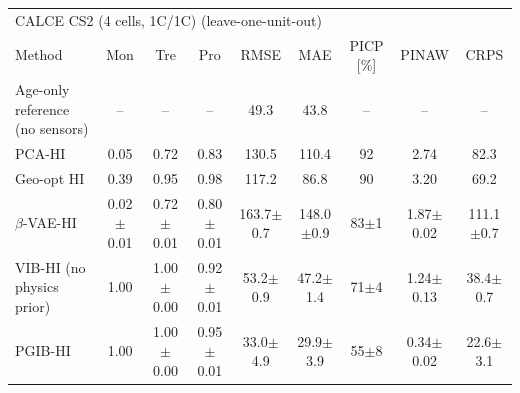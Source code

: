 \begin{tabular}{l c c c c c c c c}
\hline
\multicolumn{9}{l}{CALCE CS2 (4 cells, 1C/1C) (leave-one-unit-out)}\\
 Method & Mon & Tre & Pro & RMSE & MAE & PICP [\%] & PINAW & CRPS \\
\hline
Age-only reference (no sensors) & -- & -- & -- & 49.3 & 43.8 & -- & -- & -- \\
PCA-HI & 0.05 & 0.72 & 0.83 & 130.5 & 110.4 & 92 & 2.74 & 82.3 \\
Geo-opt HI & 0.39 & 0.95 & 0.98 & 117.2 & 86.8 & 90 & 3.20 & 69.2 \\
$\beta$-VAE-HI & 0.02$\pm$0.01 & 0.72$\pm$0.01 & 0.80$\pm$0.01 & 163.7$\pm$0.7 & 148.0$\pm$0.9 & 83$\pm$1 & 1.87$\pm$0.02 & 111.1$\pm$0.7 \\
VIB-HI (no physics prior) & 1.00 & 1.00$\pm$0.00 & 0.92$\pm$0.01 & 53.2$\pm$0.9 & 47.2$\pm$1.4 & 71$\pm$4 & 1.24$\pm$0.13 & 38.4$\pm$0.7 \\
PGIB-HI & 1.00 & 1.00$\pm$0.00 & 0.95$\pm$0.01 & 33.0$\pm$4.9 & 29.9$\pm$3.9 & 55$\pm$8 & 0.34$\pm$0.02 & 22.6$\pm$3.1 \\
\hline
\end{tabular}
